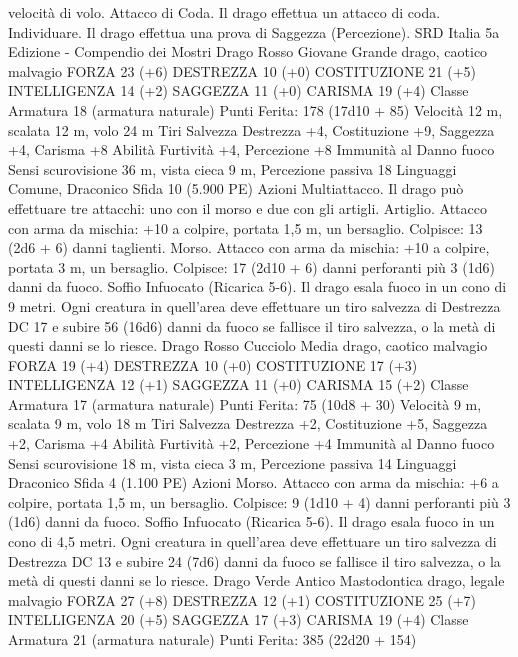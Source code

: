 \begin{multicols}{2}
velocità di volo.
Attacco di Coda. Il drago effettua un attacco di coda.
Individuare. Il drago effettua una prova di Saggezza
(Percezione).
SRD Italia 5a Edizione - Compendio dei Mostri
Drago Rosso Giovane
Grande drago, caotico malvagio
FORZA 23 (+6)
DESTREZZA 10 (+0)
COSTITUZIONE 21 (+5)
INTELLIGENZA 14 (+2)
SAGGEZZA 11 (+0)
CARISMA 19 (+4)
Classe Armatura 18 (armatura naturale)
\hspace*{0pt}\hfill{Punti Ferita}: 178 (17d10 + 85)
Velocità 12 m, scalata 12 m, volo 24 m
Tiri Salvezza Destrezza +4, Costituzione +9, Saggezza +4,
Carisma +8
Abilità Furtività +4, Percezione +8
Immunità al Danno fuoco
Sensi scurovisione 36 m, vista cieca 9 m, Percezione passiva 18
Linguaggi Comune, Draconico
Sfida 10 (5.900 PE)
Azioni
Multiattacco. Il drago può effettuare tre attacchi: uno con il
morso e due con gli artigli.
Artiglio. Attacco con arma da mischia: +10 a colpire, portata 1,5
m, un bersaglio.
Colpisce: 13 (2d6 + 6) danni taglienti.
Morso. Attacco con arma da mischia: +10 a colpire, portata 3 m,
un bersaglio.
Colpisce: 17 (2d10 + 6) danni perforanti più 3 (1d6) danni da
fuoco.
Soffio Infuocato (Ricarica 5-6). Il drago esala fuoco in un cono
di 9 metri. Ogni creatura in quell’area deve effettuare un tiro
salvezza di Destrezza DC 17 e subire 56 (16d6) danni da fuoco
se fallisce il tiro salvezza, o la metà di questi danni se lo riesce.
Drago Rosso Cucciolo
Media drago, caotico malvagio
FORZA 19 (+4)
DESTREZZA 10 (+0)
COSTITUZIONE 17 (+3)
INTELLIGENZA 12 (+1)
SAGGEZZA 11 (+0)
CARISMA 15 (+2)
Classe Armatura 17 (armatura naturale)
\hspace*{0pt}\hfill{Punti Ferita}: 75 (10d8 + 30)
Velocità 9 m, scalata 9 m, volo 18 m
Tiri Salvezza Destrezza +2, Costituzione +5, Saggezza +2,
Carisma +4
Abilità Furtività +2, Percezione +4
Immunità al Danno fuoco
Sensi scurovisione 18 m, vista cieca 3 m, Percezione passiva 14
Linguaggi Draconico
Sfida 4 (1.100 PE)
Azioni
Morso. Attacco con arma da mischia: +6 a colpire, portata 1,5
m, un bersaglio.
Colpisce: 9 (1d10 + 4) danni perforanti più 3 (1d6) danni da
fuoco.
Soffio Infuocato (Ricarica 5-6). Il drago esala fuoco in un cono
di 4,5 metri. Ogni creatura in quell’area deve effettuare un tiro
salvezza di Destrezza DC 13 e subire 24 (7d6) danni da fuoco se
fallisce il tiro salvezza, o la metà di questi danni se lo riesce.
Drago Verde Antico
Mastodontica drago, legale malvagio
FORZA 27 (+8)
DESTREZZA 12 (+1)
COSTITUZIONE 25 (+7)
INTELLIGENZA 20 (+5)
SAGGEZZA 17 (+3)
CARISMA 19 (+4)
Classe Armatura 21 (armatura naturale)
\hspace*{0pt}\hfill{Punti Ferita}: 385 (22d20 + 154)

\end{multicols}
